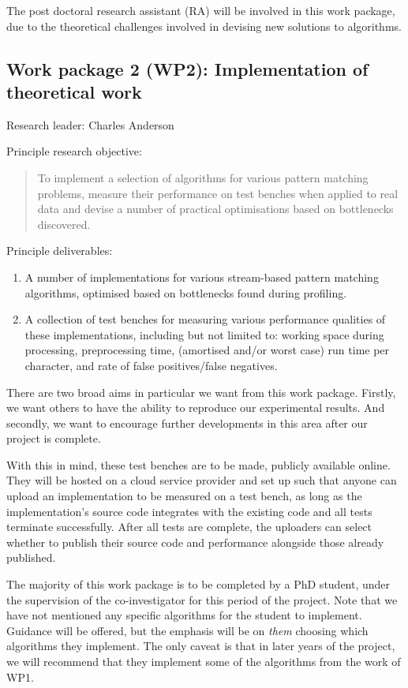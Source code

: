 \documentclass[a4paper,11pt]{article}
\begin{document}
    The post doctoral research assistant (RA) will be involved in this work package, due to the theoretical challenges involved in devising new solutions to algorithms.

    \subsection*{Work package 2 (WP2): Implementation of theoretical work}

    Research leader: Charles Anderson

    Principle research objective:
    \begin{quote}
        To implement a selection of algorithms for various pattern matching problems, measure their performance on test benches when applied to real data and devise a number of practical optimisations based on bottlenecks discovered.
    \end{quote}

    Principle deliverables:
    \begin{enumerate}
        \item A number of implementations for various stream-based pattern matching algorithms, optimised based on bottlenecks found during profiling.
        \item A collection of test benches for measuring various performance qualities of these implementations, including but not limited to: working space during processing, preprocessing time, (amortised and/or worst case) run time per character, and rate of false positives/false negatives.
    \end{enumerate}

    There are two broad aims in particular we want from this work package. Firstly, we want others to have the ability to reproduce our experimental results. And secondly, we want to encourage further developments in this area after our project is complete.

    With this in mind, these test benches are to be made, publicly available online. They will be hosted on a cloud service provider and set up such that anyone can upload an implementation to be measured on a test bench, as long as the implementation's source code integrates with the existing code and all tests terminate successfully. After all tests are complete, the uploaders can select whether to publish their source code and performance alongside those already published.

    The majority of this work package is to be completed by a PhD student, under the supervision of the co-investigator for this period of the project. Note that we have not mentioned any specific algorithms for the student to implement. Guidance will be offered, but the emphasis will be on \textit{them} choosing which algorithms they implement. The only caveat is that in later years of the project, we will recommend that they implement some of the algorithms from the work of WP1.
\end{document}
